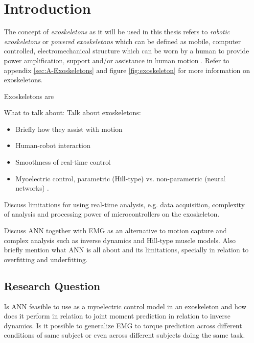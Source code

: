 \documentclass[../main.tex]{subfiles}
\begin{document}
\chapter{Introduction}
The concept of \textit{exoskeletons} as it will be used in this thesis refers to \textit{robotic exoskeletons} or \textit{powered exoskeletons} which can be defined as mobile, computer controlled, electromechanical structure which can be worn by a human to provide power amplification, support and/or assistance in human motion \cite{Anam2012, Gorgey2018}. 
Refer to appendix \ref{sec:A-Exoskeletons} and figure \ref{fig:exoskeleton} for more information on exoskeletons.

Exoskeletons are 

What to talk about:
Talk about exoskeletons:
\begin{itemize}
    \item Briefly how they assist with motion
    \item Human-robot interaction
    \item Smoothness of real-time control
    \item Myoelectric control, parametric (Hill-type) vs. non-parametric (neural networks) \cite{Anam2012}.
\end{itemize}

Discuss limitations for using real-time analysis, e.g. data acquisition, complexity of analysis and processing power of microcontrollers on the exoskeleton.

Discuss ANN together with EMG as an alternative to motion capture and complex analysis such as inverse dynamics and Hill-type muscle models. 
Also briefly mention what ANN is all about and its limitations, specially in relation to overfitting and underfitting.




\section{Research Question}
Is ANN feasible to use as a myoelectric control model in an exoskeleton and how does it perform in relation to joint moment prediction in relation to inverse dynamics. 
Is it possible to generalize EMG to torque prediction across different conditions of same subject or even across different subjects doing the same task.
\end{document}
